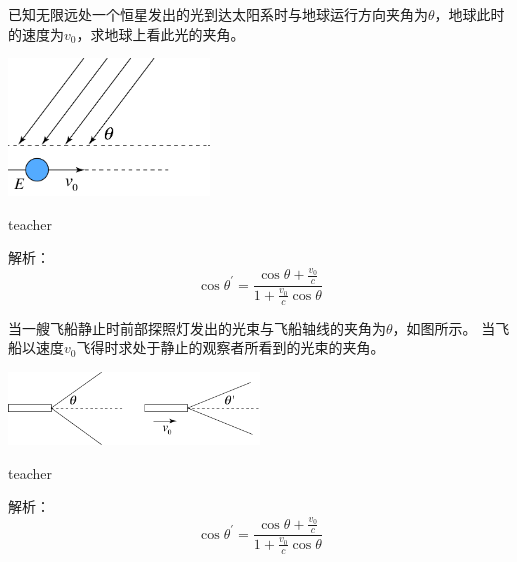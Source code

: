 \begin{example}
已知无限远处一个恒星发出的光到达太阳系时与地球运行方向夹角为$\theta$，地球此时的速度为$v_0$，求地球上看此光的夹角。
\begin{flushright}
\includegraphics[width=0.4\textwidth]{images/relativity-1.pdf}
\end{flushright}
\begin{taggedblock}{teacher}
\noindent

解析：\[\cos \theta^\prime = \frac{\cos \theta +\frac{v_0}{c}}{1+\frac{v_0}{c}\cos\theta}\]
\end{taggedblock}
\end{example}


\begin{example}
当一艘飞船静止时前部探照灯发出的光束与飞船轴线的夹角为$\theta$，如图所示。
当飞船以速度$v_0$飞得时求处于静止的观察者所看到的光束的夹角。
\begin{flushright}
\includegraphics[width=0.5\textwidth]{images/relativity-2.pdf}
\end{flushright}
\begin{taggedblock}{teacher}
\noindent

解析：\[\cos \theta^\prime = \frac{\cos \theta +\frac{v_0}{c}}{1+\frac{v_0}{c}\cos\theta}\]
\end{taggedblock}
\end{example}



